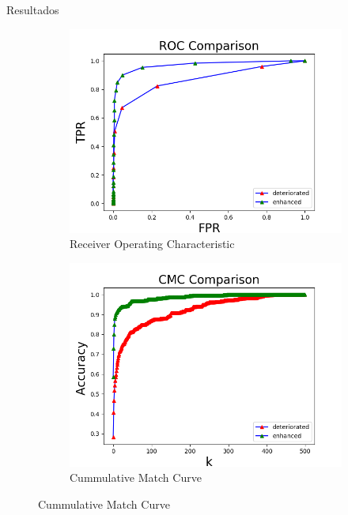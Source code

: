 \documentclass[12pt,aspectratio=169]{beamer}
\begin{document}
\begin{frame}{Resultados}

    \begin{figure}
        \begin{subfigure}{0.48\textwidth}
            \centering
            \includegraphics[scale=0.45]{figs/roc_comparison.png}
            \caption{Receiver Operating Characteristic}
        \end{subfigure}
        \begin{subfigure}{0.48\textwidth}
            \centering
            \includegraphics[scale=0.45]{figs/cmc_comparison.png}
            \caption{Cummulative Match Curve}
        \end{subfigure}
    \end{figure}

\end{frame}
\end{document}
